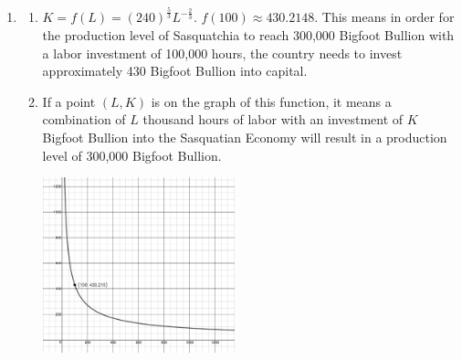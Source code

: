\documentclass{ximera}
\begin{document}
\begin{enumerate}
\setcounter{enumi}{\value{HW}}
\item \begin{enumerate}

\item $K=f(L) = (240)^{ \frac{5}{3}} L^{- \frac{2}{3}}$.  $f(100)  \approx 430.2148$.  This means in order for the production level of Sasquatchia to reach 300,000 Bigfoot Bullion with a labor investment of 100,000 hours, the country needs to invest approximately 430 Bigfoot Bullion into capital.


\item If a point $(L,K)$ is on the graph of this function, it means a combination of $L$ thousand hours of labor with an investment of $K$ Bigfoot Bullion into the Sasquatian Economy will result in a production level of 300,000 Bigfoot Bullion.

\centerline{\includegraphics[height=2in]{./PowerEqIneqGraphics/CobbDouglasExercise.jpg}}



\end{enumerate}

\end{enumerate}
\end{document}

